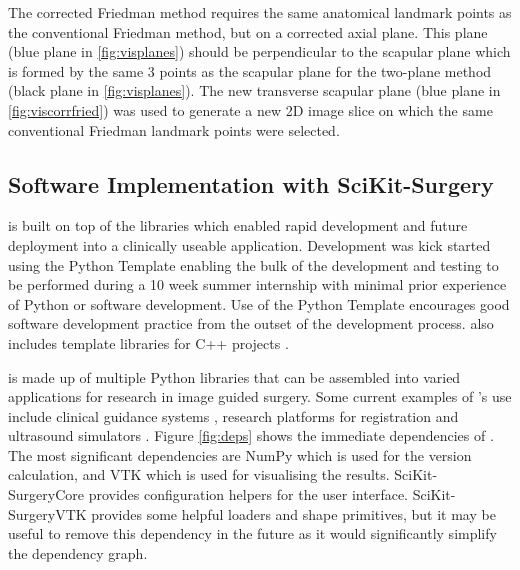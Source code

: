 The corrected Friedman method requires the same anatomical landmark points as the conventional Friedman method, but on a corrected axial plane. This plane (blue plane in \ref{fig:visplanes}) should be perpendicular to the scapular plane which is formed by the same 3 points as the scapular plane for the two-plane method (black plane in \ref{fig:visplanes}). The new transverse scapular plane (blue plane in \ref{fig:viscorrfried}) was used to generate a new 2D image slice on which the same conventional Friedman landmark points were selected.

\subsection{Software Implementation with SciKit-Surgery}
\sksglenoid is built on top of the \sksurgery \cite{PMID:32436132} libraries which enabled
rapid development and future deployment into a clinically useable application. 
Development was kick started using the \sksurgery Python Template \cite{doel_tom_2022_5879146} enabling the bulk of the development and testing to be performed during a 10 week summer internship with minimal prior experience of Python or software development. Use of the Python Template encourages good software development practice \cite{schroeder2004software} from the outset of the development process. \sksurgery also includes template libraries for C++ projects \cite{dowrick2021cmakecatchtemplate}.

\sksurgery is made up of multiple Python libraries that can be assembled into
varied applications for research in image guided surgery. Some current examples 
of \sksurgeryns's use include clinical
guidance systems \cite{schneider2020comparison}, research platforms for registration \cite{thompson2021fiducial} and ultrasound simulators \cite{thompson2020snappysonic}.
Figure \ref{fig:deps} shows the immediate dependencies of \sksglenoidns. The most significant dependencies are NumPy\cite{2020NumPy-Array} which is used for the version calculation, and {VTK}\cite{Schroeder:1998:VTO:272980} which is used for visualising the results. SciKit-SurgeryCore provides configuration helpers for the user interface. SciKit-SurgeryVTK provides some helpful loaders and shape primitives, but it may be useful to remove this dependency in the future as it would significantly simplify the dependency graph.

